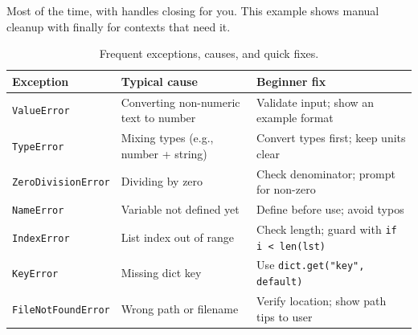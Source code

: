 
Most of the time, with handles closing for you. This example shows manual cleanup with finally for contexts that need it.




\renewcommand{\arraystretch}{1.12}
\begin{table}[h]
\centering
\begin{tabularx}{\textwidth}{|l|X|X|}
\hline
\textbf{Exception} & \textbf{Typical cause} & \textbf{Beginner fix} \\ \hline
\texttt{ValueError} & Converting non-numeric text to number & Validate input; show an example format \\ \hline
\texttt{TypeError} & Mixing types (e.g., number + string) & Convert types first; keep units clear \\ \hline
\texttt{ZeroDivisionError} & Dividing by zero & Check denominator; prompt for non-zero \\ \hline
\texttt{NameError} & Variable not defined yet & Define before use; avoid typos \\ \hline
\texttt{IndexError} & List index out of range & Check length; guard with \texttt{if i < len(lst)} \\ \hline
\texttt{KeyError} & Missing dict key & Use \texttt{dict.get("key", default)} \\ \hline
\texttt{FileNotFoundError} & Wrong path or filename & Verify location; show path tips to user \\ \hline
\end{tabularx}
\caption{Frequent exceptions, causes, and quick fixes.}
\end{table}



